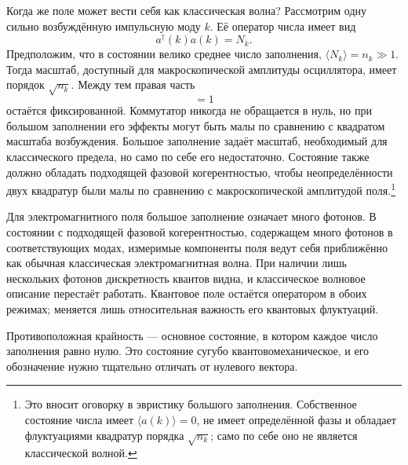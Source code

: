 Когда же поле может вести себя как классическая волна? Рассмотрим одну сильно возбуждённую импульсную моду \(k\). Её оператор числа имеет вид
\begin{equation}
a^\dagger(k)a(k)=N_k.
\end{equation}
Предположим, что в состоянии велико среднее число заполнения, \(\langle N_k\rangle=n_k\gg 1\). Тогда масштаб, доступный для макроскопической амплитуды осциллятора, имеет порядок \(\sqrt{n_k}\). Между тем правая часть
\begin{equation}
[a(k),a^\dagger(k)]=1
\end{equation}
остаётся фиксированной. Коммутатор никогда не обращается в нуль, но при большом заполнении его эффекты могут быть малы по сравнению с квадратом масштаба возбуждения. Большое заполнение задаёт масштаб, необходимый для классического предела, но само по себе его недостаточно. Состояние также должно обладать подходящей фазовой когерентностью, чтобы неопределённости двух квадратур были малы по сравнению с макроскопической амплитудой поля.\footnote{Это вносит оговорку в эвристику большого заполнения. Собственное состояние числа имеет \(\langle a(k)\rangle=0\), не имеет определённой фазы и обладает флуктуациями квадратур порядка \(\sqrt{n_k}\); само по себе оно не является классической волной.}

Для электромагнитного поля большое заполнение означает много фотонов. В состоянии с подходящей фазовой когерентностью, содержащем много фотонов в соответствующих модах, измеримые компоненты поля ведут себя приближённо как обычная классическая электромагнитная волна. При наличии лишь нескольких фотонов дискретность квантов видна, и классическое волновое описание перестаёт работать. Квантовое поле остаётся оператором в обоих режимах; меняется лишь относительная важность его квантовых флуктуаций.

\begin{classroomqa}
\end{classroomqa}

Противоположная крайность — основное состояние, в котором каждое число заполнения равно нулю. Это состояние сугубо квантовомеханическое, и его обозначение нужно тщательно отличать от нулевого вектора.

